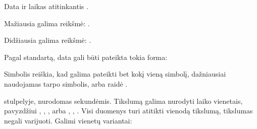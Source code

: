\documentclass[letterpaper,10pt,lithuanian]{sphinxmanual}
\begin{document}
\begin{fulllineitems}
\label{\detokenize{tipai:type.datetime}}
\pysigstartsignatures
{}
\pysigstopsignatures
\sphinxAtStartPar
Data ir laikas atitinkantis .

\sphinxAtStartPar
Mažiausia galima reikšmė: .

\sphinxAtStartPar
Didžiausia galima reikšmė: .

\sphinxAtStartPar
Pagal  standartą, data gali būti pateikta tokia forma:

\begin{sphinxVerbatim}[commandchars=\\\{\}]
\PYG{p}{[}\PYG{p}{[}\PYG{p}{[}\PYG{p}{[}\PYG{p}{[}\PYG{p}{]}\PYG{p}{]}\PYG{p}{]}\PYG{p}{]}\PYG{p}{[}\PYG{p}{[}\PYG{p}{[}\PYG{p}{]}\PYG{p}{]}\PYG{p}{]}\PYG{p}{]}
\end{sphinxVerbatim}

\sphinxAtStartPar
Simbolis \sphinxcode{\sphinxupquote{*}} reiškia, kad galima pateikti bet kokį vieną simbolį,
dažniausiai naudojamas tarpo simbolis, arba raidė .

\sphinxAtStartPar
{\hyperref[\detokenize{dimensijos:property.ref}]{}} stulpelyje, nurodomas 
sekundėmis. Tikslumą galima nurodyti laiko vienetais, pavyzdžiui ,
, , arba , , . Visi duomenys turi atitikti vienodą
tikslumą, tikslumas negali varijuoti. Galimi vienetų variantai:



\end{fulllineitems}
\end{document}
